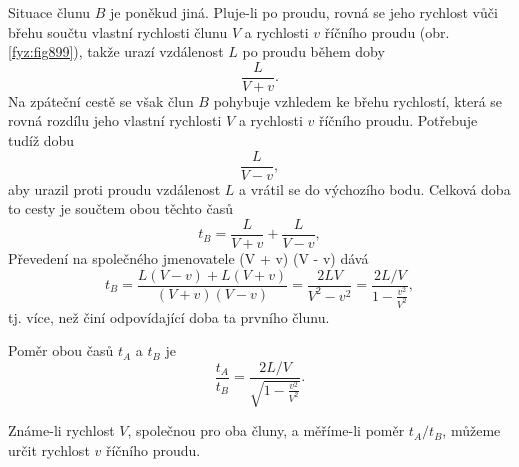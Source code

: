 \begin{mdframed}[style=mdexam]
\begin{example}
    Situace člunu \(B\) je poněkud jiná. Pluje-li po proudu, rovná se jeho rychlost vůči břehu
    součtu vlastní rychlosti člunu \(V\) a rychlosti \(v\) říčního proudu (obr. \ref{fyz:fig899}),
    takže urazí vzdálenost \(L\) po proudu během doby
    \begin{equation*}
      \frac{L}{V+v}.
    \end{equation*}
    Na zpáteční cestě se však člun \(B\) pohybuje vzhledem ke břehu rychlostí, která se rovná
    rozdílu jeho vlastní rychlosti \(V\) a rychlosti \(v\) říčního proudu. Potřebuje tudíž dobu
    \begin{equation*}
      \frac{L}{V-v},
    \end{equation*}
    aby urazil proti proudu vzdálenost \(L\) a vrátil se do výchozího bodu. Celková doba to cesty je
    součtem obou těchto časů
    \begin{equation*}
      t_B = \frac{L}{V+v} + \frac{L}{V-v},
    \end{equation*}
    Převedení na společného jmenovatele (V + v) (V - v) dává 
    \begin{equation*}
      t_B = \frac{L(V-v)+L(V+v)}{(V+v)(V-v)} = \frac{2LV}{V^2 -v^2} 
          = \frac{2L/V}{1 - \frac{v^2}{V^2}},
    \end{equation*}
    tj. více, než činí odpovídající doba ta prvního člunu.

    {\centering
    \captionsetup{type=figure}
    \par}

    Poměr obou časů \(t_A\) a \(t_B\) je
    \begin{equation*}
      \frac{t_A}{t_B} = \frac{2L/V}{\sqrt{1 - \frac{v^2}{V^2}}}.
    \end{equation*}

    Známe-li rychlost \(V\), společnou pro oba čluny, a měříme-li poměr \(t_A/t_B\), můžeme určit
    rychlost \(v\) říčního proudu.
  \end{example}
\end{mdframed}